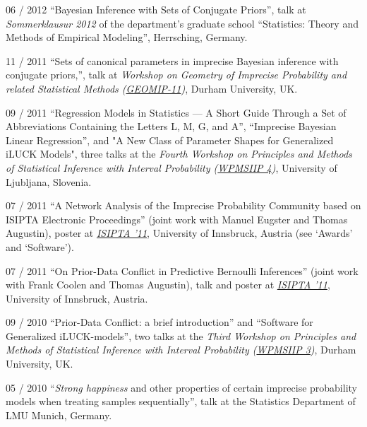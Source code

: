 \documentclass[a4paper]{simplecv}
\begin{document}
\begin{topic}
\item[06 / 2012] ``Bayesian Inference with Sets of Conjugate Priors'', talk at \emph{Sommerklausur 2012} of the department's graduate school
                 ``Statistics: Theory and Methods of Empirical Modeling'', Herrsching, Germany.

\item[11 / 2011] ``Sets of canonical parameters in imprecise Bayesian inference with conjugate priors,'', talk at
                 \emph{Workshop on Geometry of Imprecise Probability and related Statistical Methods (\href{http://maths.dur.ac.uk/stats/people/fc/geomip11.html}{GEOMIP-11})}, Durham University, UK.

\item[09 / 2011] ``Regression Models in Statistics --- A Short Guide Through a Set of Abbreviations Containing the Letters L, M, G, and A'',
                 ``Imprecise Bayesian Linear Regression'', and "A New Class of Parameter Shapes for Generalized iLUCK Models",
                 three talks at the
                 \emph{Fourth Workshop on Principles and Methods of Statistical Inference with Interval Probability (\href{http://wpmsiip2011.fdvinfo.net/c/646/Information/}{WPMSIIP 4})},
                 University of Ljubljana, Slovenia.

\item[07 / 2011] ``A Network Analysis of the Imprecise Probability Community based on ISIPTA Electronic Proceedings''
                 (joint work with Manuel Eugster and Thomas Augustin),
                 poster at \emph{\href{http://www.sipta.org/isipta11/}{ISIPTA '11}}, University of Innsbruck, Austria (see `Awards' and `Software').

\item[07 / 2011] ``On Prior-Data Conflict in Predictive Bernoulli Inferences'' (joint work with Frank Coolen and Thomas Augustin),
                 talk and poster at \emph{\href{http://www.sipta.org/isipta11/}{ISIPTA '11}}, University of Innsbruck, Austria.

\item[09 / 2010] ``Prior-Data Conflict: a brief introduction'' and ``Software for Generalized iLUCK-models'', two talks at the
                 \emph{Third Workshop on Principles and Methods of Statistical Inference with Interval Probability (\href{http://www.maths.dur.ac.uk/users/matthias.troffaes/wpmsiip2010/}{WPMSIIP 3})},
                 Durham University, UK.

\item[05 / 2010] ``\emph{Strong happiness} and other properties of certain imprecise probability models when treating samples sequentially'',
                 talk at the Statistics Department of LMU Munich, Germany.


\end{topic}
\end{document}
